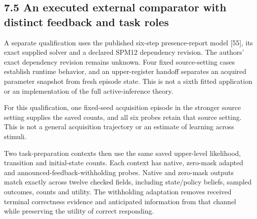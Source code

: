 \documentclass[
  american,
  11pt,
  letterpaper,
]{article}
\begin{document}
\clearpage

\subsection{7.5 An executed external comparator with distinct feedback and task roles}\label{an-executed-external-comparator-with-distinct-feedback-and-task-roles}

A separate qualification uses the published six-step presence-report model {[}55{]}, its exact supplied solver and a declared SPM12 dependency revision. The authors' exact dependency revision remains unknown. Four fixed source-setting cases establish runtime behavior, and an upper-register handoff separates an acquired parameter snapshot from fresh episode state. This is not a sixth fitted application or an implementation of the full active-inference theory.

For this qualification, one fixed-seed acquisition episode in the stronger source setting supplies the saved counts, and all six probes retain that source setting. This is not a general acquisition trajectory or an estimate of learning across stimuli.

Two task-preparation contexts then use the same saved upper-level likelihood, transition and initial-state counts. Each context has native, zero-mask adapted and announced-feedback-withholding probes. Native and zero-mask outputs match exactly across twelve checked fields, including state/policy beliefs, sampled outcomes, counts and utility. The withholding adaptation removes received terminal correctness evidence and anticipated information from that channel while preserving the utility of correct responding.
\end{document}
